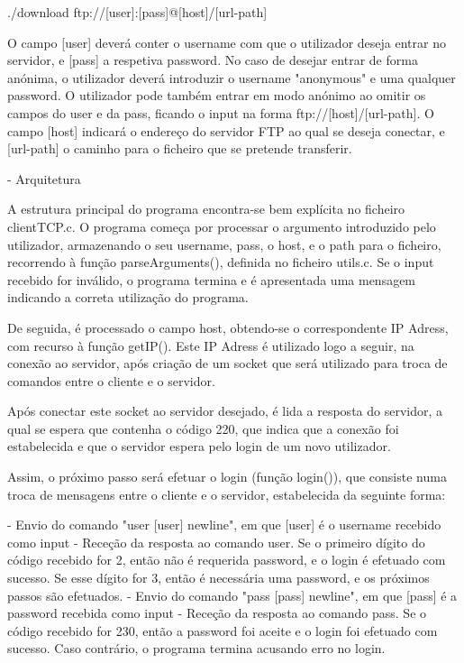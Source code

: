 \documentclass[article, a4paper, 11pt, oneside]{memoir}
\begin{document}
./download ftp://[user]:[pass]@[host]/[url-path]

O campo [user] deverá conter o username com que o utilizador deseja entrar no servidor, e [pass] a respetiva password.
No caso de desejar entrar de forma anónima, o utilizador deverá introduzir o username "anonymous" e uma qualquer password.
O utilizador pode também entrar em modo anónimo ao omitir os campos do user e da pass, ficando o input na forma ftp://[host]/[url-path].
O campo [host] indicará o endereço do servidor FTP ao qual se deseja conectar, e [url-path] o caminho para o ficheiro que se pretende transferir.

- Arquitetura

A estrutura principal do programa encontra-se bem explícita no ficheiro clientTCP.c.
O programa começa por processar o argumento introduzido pelo utilizador, armazenando o seu username,
pass, o host, e o path para o ficheiro, recorrendo à função parseArguments(), definida no ficheiro utils.c.
Se o input recebido for inválido, o programa termina e é apresentada uma mensagem indicando a correta utilização do programa.

De seguida, é processado o campo host, obtendo-se o correspondente IP Adress, com recurso à função getIP().
Este IP Adress é utilizado logo a seguir, na conexão ao servidor, após criação de um socket que será utilizado
para troca de comandos entre o cliente e o servidor.

Após conectar este socket ao servidor desejado, é lida a resposta do servidor, a qual se espera que contenha o código 220,
que indica que a conexão foi estabelecida e que o servidor espera pelo login de um novo utilizador. 

Assim, o próximo passo será efetuar o login (função login()), que consiste numa troca de mensagens entre o cliente e o servidor,
estabelecida da seguinte forma:

  - Envio do comando "user [user] newline", em que [user] é o username recebido como input
  - Receção da resposta ao comando user. Se o primeiro dígito do código recebido for 2, então não é requerida password, e o login é efetuado com sucesso. Se esse dígito for 3, então é necessária uma password, e os próximos passos são efetuados.
  - Envio do comando "pass [pass] newline", em que [pass] é a password recebida como input
  - Receção da resposta ao comando pass. Se o código recebido for 230, então a password foi aceite e o login foi efetuado com sucesso. Caso contrário, o programa termina acusando erro no login.
\end{document}
